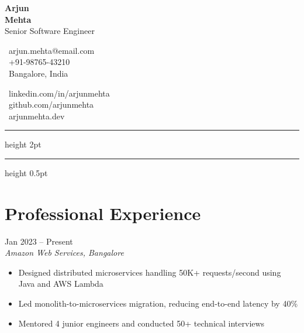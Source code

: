 \documentclass[10pt,a4paper]{article}
\begin{document}
\noindent\begin{minipage}[b]{0.30\textwidth}
\raggedright
{\fontsize{24pt}{28pt}\selectfont\bfseries\color{headercolor}Arjun}\\
{\fontsize{24pt}{28pt}\selectfont\bfseries\color{accentcolor}Mehta}\\[4pt]
{\small\color{rulecolor}Senior Software Engineer}
\end{minipage}%
\hfill%
\begin{minipage}[b]{0.30\textwidth}
\centering
\small\color{headercolor}
\faEnvelope\ arjun.mehta@email.com\\[2pt]
\faPhone\ +91-98765-43210\\[2pt]
\faMapMarker*\ Bangalore, India
\end{minipage}%
\hfill%
\begin{minipage}[b]{0.30\textwidth}
\raggedleft
\small\color{headercolor}
\faLinkedin\ linkedin.com/in/arjunmehta\\[2pt]
\faGithub\ github.com/arjunmehta\\[2pt]
\faGlobe\ arjunmehta.dev
\end{minipage}

\vspace{8pt}
{\color{rulecolor}\hrule height 2pt}
\vspace{2pt}
{\color{accentcolor}\hrule height 0.5pt}
\vspace{10pt}

\section{Professional Experience}

 \hfill {\small\color{accentcolor}Jan 2023 -- Present}\\
{\itshape Amazon Web Services, Bangalore}
\begin{itemize}[leftmargin=1em, itemsep=0pt, topsep=3pt, label={\color{accentcolor}\textbullet}]
\item \small Designed distributed microservices handling 50K+ requests/second using Java and AWS Lambda
\item \small Led monolith-to-microservices migration, reducing end-to-end latency by 40\%
\item \small Mentored 4 junior engineers and conducted 50+ technical interviews
\end{itemize}
\vspace{8pt}
\end{document}
